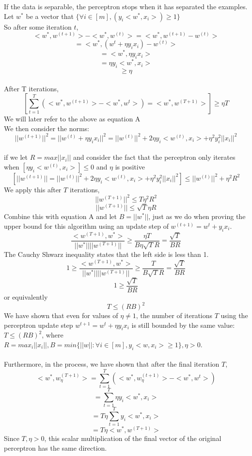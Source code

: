 \documentclass[12pt]{article}
\begin{document}
\begin{enumerate}
    If the data is separable, the perceptron stops when it has separated the examples.\\
    Let $w^*$ be a vector that $\{\forall i\in [m], (y_i<w^*,x_i>)\geq 1\}$\\
    So after some iteration $t$, $$<w^*,w^{(t+1)}>-<w^*,w^{(t)}>=<w^*,w^{(t+1)}-w^{(t)}>$$$$=<w^*,(w^t+\eta y_ix_i)-w^{(t)}>$$$$=<w^*,\eta y_ix_i>$$$$=\eta y_i<w^*,x_i>$$$$\geq \eta$$\\
    After T iterations, $$[\sum^T_{t=1}(<w^*,w^{(t+1)}>-<w^*,w^{t}>)=<w^*,w^{(T+1)}>]\geq \eta T$$We will later refer to the above as equation A\\
    We then consider the norms:
    $$||w^{(t+1)}||^2=||w^{(t)}+\eta y_ix_i||^2=||w^{(t)}||^2+2\eta y_i<w^{(t)},x_i>+\eta^2y_i^2||x_i||^2$$\\
    if we let $R=max||x_i||$ and consider the fact that the perceptron only iterates when $[\eta y_i<w^{(t)},x_i>]\leq 0$ and $\eta$ is positive
    $$[||w^{(t+1)}||=||w^{(t)}||^2+2\eta y_i<w^{(t)},x_i>+\eta^2y_i^2||x_i||^2]\leq ||w^{(t)}||^2+\eta^2R^2$$
    We apply this after $T$ iterations, $$||w^{(T+1)}||^2\leq T\eta^2R^2$$$$||w^{(T+1)}||\leq\sqrt{T}\eta R$$
    Combine this with equation A and let $B=||w^*||$, just as we do when proving the upper bound for this algorithm using an update step of $w^{(t+1)}=w^t+y_ix_i$.
    $$\frac{<w^{(T+1)},w^*>}{||w^*||||w^{(T+1)}||}\geq\frac{\eta T}{B\eta\sqrt{T}R}=\frac{\sqrt{T}}{BR}$$
    The Cauchy Shwarz inequality states that the left side is less than 1.
    $$1\geq\frac{<w^{(T+1)},w^*>}{||w^*||||w^{(T+1)}||}\geq\frac{T}{B\sqrt{T}R}=\frac{\sqrt{T}}{BR}$$
    $$1\geq\frac{\sqrt{T}}{BR}$$
    or equivalently
    $$T\leq (RB)^2$$
    We have shown that even for values of $\eta\neq 1$, the number of iterations $T$ using the perceptron update step $w^{t+1}=w^t+\eta y_ix_i$ is still bounded by the same value: $T\leq (RB)^2$, where $R=max_i||x_i||,B=min\{||w||:\forall i \in [m], y_i<w,x_i>\geq 1\},\eta>0$.\\\\
    Furthermore, in the process, we have shown that after the final iteration $T$, $$<w^*,w^{(T+1)}_\eta>=\sum^T_{t=1}(<w^*,w^{(t+1)}_\eta>-<w^*,w^{t}>)$$$$=\sum^T_{t=1}\eta y_i<w^*,x_i>$$$$=T\eta\sum^T_{t=1}y_i<w^*,x_i>$$$$=T\eta<w^*,w^{(T+1)}>$$ Since $T,\eta>0$, this scalar multiplication of the final vector of the original perceptron has the same direction.
\end{enumerate}
\end{document}
